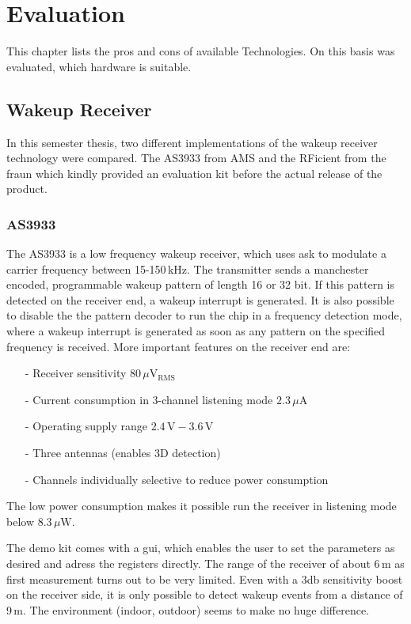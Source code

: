 \chapter{Evaluation}
This chapter lists the pros and cons of available Technologies.
On this basis was evaluated, which hardware is suitable.

\section{Wakeup Receiver}
In this semester thesis, two different implementations of the wakeup receiver technology were compared.
The AS3933 from AMS and the RFicient from the \acf{fraun} which kindly provided an evaluation kit before the actual release of the product.

\subsection{AS3933}
The AS3933 is a low frequency wakeup receiver, which uses \acs{ask} to modulate a carrier frequency between 15-150\,kHz.
The transmitter sends a manchester encoded, programmable wakeup pattern of length 16 or 32 bit.
If this pattern is detected on the receiver end, a wakeup interrupt is generated.
It is also possible to disable the the pattern decoder to run the chip in a frequency detection mode, where a wakeup interrupt is generated as soon as any pattern on the specified frequency is received.
More important features on the receiver end are:
\begin{itemize}
	\item[-] Receiver sensitivity $80\,\mu\text{V$_{\text{RMS}}$}$
	\item[-] Current consumption in 3-channel listening mode $2.3\,\mu\text{A}$
	\item[-] Operating supply range $2.4\,\text{V}-3.6\,\text{V}$
	\item[-] Three antennas (enables 3D detection)
	\item[-] Channels  individually selective to reduce power consumption
\end{itemize}
The low power consumption makes it possible run the receiver in listening mode below $8.3\,\mu\text{W}$\cite{as3933}.

The demo kit comes with a \acs{gui}, which enables the user to set the parameters as desired and adress the registers directly.
The range of the receiver of about 6\,m as first measurement turns out to be very limited.
Even with a 3db sensitivity boost on the receiver side, it is only possible to detect wakeup events from a distance of 9\,m.
The environment (indoor, outdoor) seems to make no huge difference.

